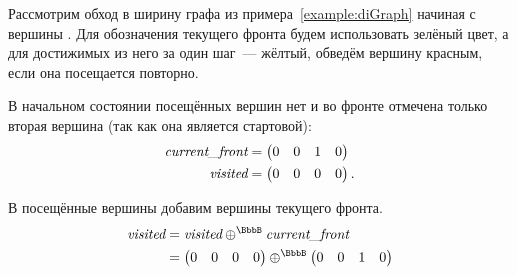 \begin{example}

    Рассмотрим обход в ширину графа из примера~\ref{example:diGraph} начиная с вершины .
    Для обозначения текущего фронта будем использовать зелёный цвет, а для достижимых из него за один шаг~--- жёлтый, обведём вершину красным, если она посещается повторно.

    В начальном состоянии посещённых вершин нет и во фронте отмечена только вторая вершина (так как она является стартовой):
    \begin{align*}
        \emph{current\_front} & =
        \begin{pmatrix}
            0 & 0 & 1 & 0
        \end{pmatrix}
        \\
        \emph{visited}        & =
        \begin{pmatrix}
            0 & 0 & 0 & 0
        \end{pmatrix}.
    \end{align*}

    \begin{marginfigure}
        \begin{center}
            \resizebox{\marginparwidth}{!}{}
        \end{center}
        \caption{Обход в ширину, шаг первый}
        \label{fig:bfs_step_1}
    \end{marginfigure}

    В посещённые вершины добавим вершины текущего фронта.
    \begin{align*}
        \emph{visited} & = \emph{visited} \oplus^\BbbB \emph{current\_front} \\
                       & =
        \begin{pmatrix}
            0 & 0 & 0 & 0
        \end{pmatrix}\oplus^\BbbB
        \begin{pmatrix}
            0 & 0 & 1 & 0
        \end{pmatrix}
    \end{align*}


\end{example}
